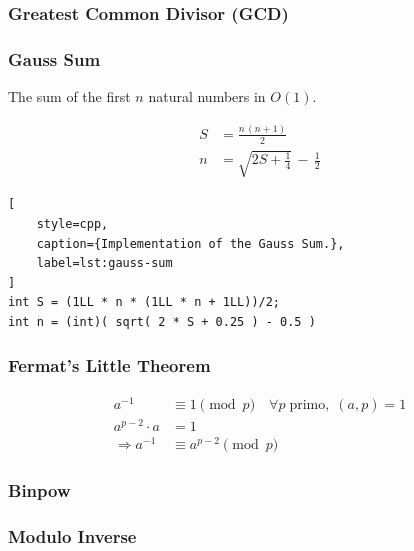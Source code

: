 \documentclass[letterpaper,landscape]{article}
\begin{document}
\subsubsection{Greatest Common Divisor (GCD)}



\subsubsection{Gauss Sum}

The sum of the first $n$ natural numbers in $O(1)$.

\begin{align}
    S &= \frac{n \, (n+1)}{2} \\[0.3cm]
    n &= \sqrt{2S+\frac{1}{4}} \, - \, \frac{1}{2}
\end{align}

\begin{lstlisting}[
    style=cpp,
    caption={Implementation of the Gauss Sum.},
    label=lst:gauss-sum
]
int S = (1LL * n * (1LL * n + 1LL))/2;
int n = (int)( sqrt( 2 * S + 0.25 ) - 0.5 )
\end{lstlisting}

\subsubsection{Fermat's Little Theorem}

\begin{align*}
  a^{-1} &\equiv 1 \pmod{p} \quad \forall p \; \text{primo}, \; (a,p) = 1 \\
a^{p-2} \cdot a &= 1 \\
\Rightarrow a^{-1} &\equiv a^{p-2} \pmod{p}
\end{align*}

\subsubsection{Binpow}



\subsubsection{Modulo Inverse}
\end{document}
